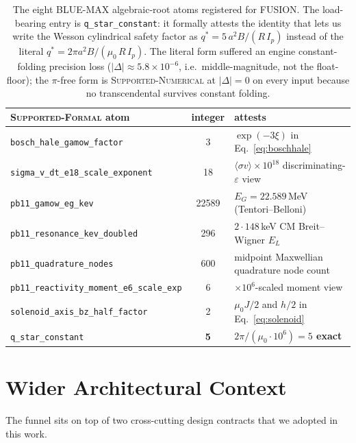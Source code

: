 \documentclass[11pt,a4paper]{article}
\begin{document}
\begin{table}[h]
\centering
\small
\begin{tabular}{lcl}
\toprule
\textsc{Supported-Formal} atom & integer & attests \\
\midrule
\verb|bosch_hale_gamow_factor|             & 3     & $\exp(-3\xi)$ in Eq.~\eqref{eq:boschhale} \\
\verb|sigma_v_dt_e18_scale_exponent|       & 18    & $\langle\sigma v\rangle\!\times\!10^{18}$ discriminating-$\varepsilon$ view \\
\verb|pb11_gamow_eg_kev|                   & 22589 & $E_G = 22.589$\,MeV (Tentori--Belloni) \\
\verb|pb11_resonance_kev_doubled|          & 296   & $2\cdot148$\,keV CM Breit--Wigner $E_L$ \\
\verb|pb11_quadrature_nodes|               & 600   & midpoint Maxwellian quadrature node count \\
\verb|pb11_reactivity_moment_e6_scale_exp| & 6     & $\times10^{6}$-scaled moment view \\
\verb|solenoid_axis_bz_half_factor|        & 2     & $\mu_0 J/2$ and $h/2$ in Eq.~\eqref{eq:solenoid} \\
\verb|q_star_constant|                     & \textbf{5} & \textbf{$2\pi/(\mu_0\!\cdot\!10^{6}) = 5$ exact} \\
\bottomrule
\end{tabular}
\caption{The eight BLUE-MAX algebraic-root atoms registered for
FUSION. The load-bearing entry is \texttt{q\_star\_constant}: it
formally attests the identity that lets us write the Wesson
cylindrical safety factor as $q^{*} = 5\,a^{2}B / (R\,I_{p})$ instead
of the literal $q^{*} = 2\pi a^{2} B / (\mu_0\,R\,I_{p})$. The literal
form suffered an engine constant-folding precision loss
($|\Delta|\approx 5.8\!\times\!10^{-6}$, i.e.\ middle-magnitude, not
the float-floor); the $\pi$-free form is \textsc{Supported-Numerical}
at $|\Delta|=0$ on every input because no transcendental survives
constant folding.}
\label{tab:bluemax}
\end{table}

\section{Wider Architectural Context}
\label{sec:context}

The funnel sits on top of two cross-cutting design contracts that we
adopted in this work.
\end{document}
